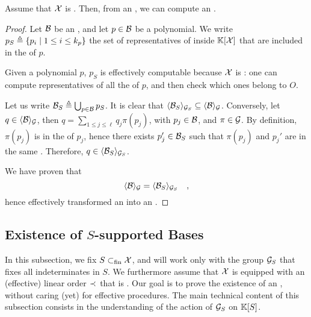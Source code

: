 \begin{lemma}
    Assume that $\mathcal{X}$ is .
    Then,
    from an , we can compute
    an .
\end{lemma}
\begin{proof}
    Let $\Basis$ be an , and let $p \in \Basis$
    be a polynomial. We write $p_S \triangleq \{ p_i \mid 1 \leq i \leq k_p \}$ the
    set of representatives of  inside $\mathbb{K}[\mathcal{X}]$
    that are included in the  of $p$. 

    Given a polynomial $p$, $p_S$ is effectively computable because $\mathcal{X}$ is
    : one can compute representatives of all the
     of $p$, and then check which ones belong to $O$.

    Let us write $\Basis_S \defined \bigcup_{p \in \Basis} p_S$. It is clear
    that $\gen{\Basis_S}{\group_S} \subseteq \gen{\Basis}{\group}$. Conversely,
    let $q \in \gen{\Basis}{\group}$, then $q = \sum_{1 \leq j \leq \ell} q_j
    \pi(p_j)$, with $p_j \in \Basis$, and $\pi \in \mathcal{G}$. By definition,
    $\pi(p_j)$ is in the  of $p_j$, hence there exists $p_j'
    \in \Basis_S$ such that $\pi(p_j)$ and $p_j'$ are in the same
    . Therefore, $q \in \gen{\Basis_S}{\group_S}$.

    We have proven that 
    \begin{equation*}
        \gen{\Basis}{\group} = \gen{\Basis_S}{\group_S} \quad ,
    \end{equation*}
    hence effectively transformed an 
    into an .
\end{proof}


\subsection{Existence of $S$-supported Bases}
\label{subsec:weakgb}

In this subsection, we fix $S \subset_{\text{fin}} \mathcal{X}$, and will work only with the group
$\mathcal{G}_S$ that fixes all indeterminates in $S$. We furthermore assume that
$\mathcal{X}$ is equipped with an (effective) linear order $\prec_{}$ that is
. Our goal is to prove the existence of an
, without caring (yet) for effective
procedures. The main technical content of this subsection consists in the
understanding of the action of $\mathcal{G}_S$ on $\mathbb{K}[S]$.


